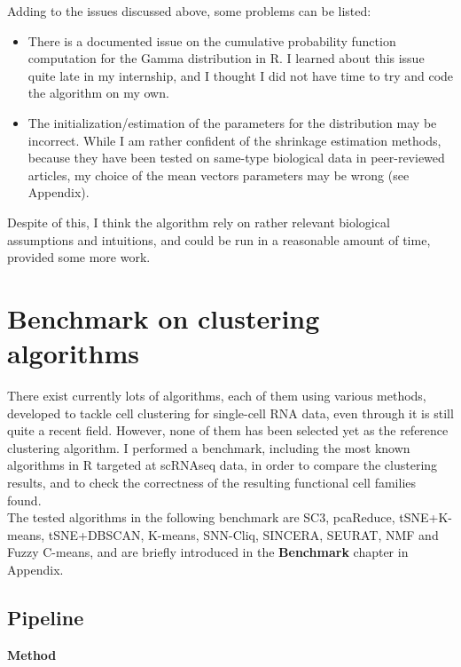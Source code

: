\documentclass{report}
\begin{document}
Adding to the issues discussed above, some problems can be listed:\\

\begin{itemize}
\item There is a documented issue on the cumulative probability function computation for the Gamma distribution in R\cite{pgammaissue}. I learned about this issue quite late in my internship, and I thought I did not have time to try and code the algorithm on my own.
\item The initialization/estimation of the parameters for the distribution may be incorrect. While I am rather confident of the shrinkage estimation methods, because they have been tested on same-type biological data in peer-reviewed articles, my choice of the mean vectors parameters may be wrong (see Appendix).
\end{itemize}

Despite of this, I think the algorithm rely on rather relevant biological assumptions and intuitions, and could be run in a reasonable amount of time, provided some more work.

\chapter{Benchmark on clustering algorithms}

There exist currently lots of algorithms, each of them using various methods, developed to tackle cell clustering for single-cell RNA data, even through it is still quite a recent field. However, none of them has been selected yet as the reference clustering algorithm. I performed a benchmark, including the most known algorithms in R targeted at scRNAseq data, in order to compare the clustering results, and to check the correctness of the resulting functional cell families found.\\

The tested algorithms in the following benchmark are SC3, pcaReduce, tSNE+K-means, tSNE+DBSCAN, K-means, SNN-Cliq, SINCERA, SEURAT, NMF and Fuzzy C-means, and are briefly introduced in the \textbf{Benchmark} chapter in Appendix.\\

\section{Pipeline}

\bigskip
\noindent \textbf{Method}
\bigskip
\end{document}
